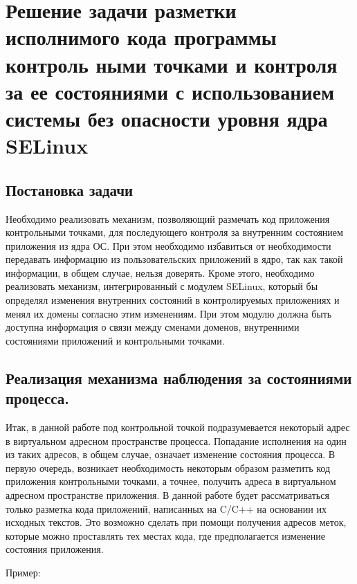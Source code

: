 
\section{Решение задачи разметки исполнимого кода программы контроль
ными точками и контроля за ее состояниями с использованием системы без
опасности уровня ядра SELinux}

\subsection{Постановка задачи} 

Необходимо реализовать механизм, позволяющий
размечать код приложения контрольными точками, 
для последующего контроля за внутренним состоянием 
приложения из ядра ОС. При этом необходимо 
избавиться от необходимости передавать 
информацию из пользовательских приложений 
в ядро, так как такой информации, в общем случае, 
нельзя доверять. Кроме этого, необходимо 
реализовать механизм, интегрированный с 
модулем SELinux, который бы определял изменения 
внутренних состояний в контролируемых приложениях
и менял их домены согласно этим изменениям. 
При этом модулю должна быть доступна 
информация о связи между сменами доменов, 
внутренними состояниями приложений 
и контрольными точками.
 
\bigskip 
\subsection{Реализация механизма наблюдения
 за состояниями процесса.}

Итак, в данной работе под контрольной точкой 
подразумевается некоторый адрес в виртуальном 
адресном пространстве процесса. Попадание 
исполнения на один из таких адресов, в общем 
случае, означает изменение состояния процесса. 
В первую очередь, возникает необходимость 
некоторым образом разметить код приложения 
контрольными точками, а точнее, получить адреса 
в виртуальном адресном пространстве приложения. 
В данной работе будет рассматриваться только
разметка кода приложений, написанных на C/C++ 
на основании их исходных текстов. Это возможно 
сделать при помощи получения адресов меток, 
которые можно проставлять тех местах кода,
где предполагается изменение состояния приложения. 

Пример: 

